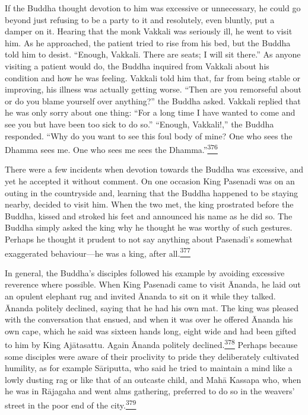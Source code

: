 If the Buddha thought devotion to him was excessive or unnecessary, he
could go beyond just refusing to be a party to it and resolutely, even
bluntly, put a damper on it. Hearing that the monk Vakkali was seriously
ill, he went to visit him. As he approached, the patient tried to rise
from his bed, but the Buddha told him to desist. ``Enough, Vakkali.
There are seats; I will sit there.'' As anyone visiting a patient would
do, the Buddha inquired from Vakkali about his condition and how he was
feeling. Vakkali told him that, far from being stable or improving, his
illness was actually getting worse. ``Then are you remorseful about or
do you blame yourself over anything?'' the Buddha asked. Vakkali replied
that he was only sorry about one thing: ``For a long time I have wanted
to come and see you but have been too sick to do so.'' ``Enough,
Vakkali!,'' the Buddha responded. ``Why do you want to see this foul
body of mine? One who sees the Dhamma sees me. One who sees me sees the
Dhamma.''\label{footprints_split_011.html_fnref376}\hyperref[footprints_split_024.htmlux5cux23fn376]{\textsuperscript{376}}

There were a few incidents when devotion towards the Buddha was
excessive, and yet he accepted it without comment. On one occasion King
Pasenadi was on an outing in the countryside and, learning that the
Buddha happened to be staying nearby, decided to visit him. When the two
met, the king prostrated before the Buddha, kissed and stroked his feet
and announced his name as he did so. The Buddha simply asked the king
why he thought he was worthy of such gestures. Perhaps he thought it
prudent to not say anything about Pasenadi's somewhat exaggerated
behaviour---he was a king, after
all.\label{footprints_split_011.html_fnref377}\hyperref[footprints_split_024.htmlux5cux23fn377]{\textsuperscript{377}}

In general, the Buddha's disciples followed his example by avoiding
excessive reverence where possible. When King Pasenadi came to visit
Ānanda, he laid out an opulent elephant rug and invited Ānanda to sit on
it while they talked. Ānanda politely declined, saying that he had his
own mat. The king was pleased with the conversation that ensued, and
when it was over he offered Ānanda his own cape, which he said was
sixteen hands long, eight wide and had been gifted to him by King
Ajātasattu. Again Ānanda politely
declined.\label{footprints_split_011.html_fnref378}\hyperref[footprints_split_024.htmlux5cux23fn378]{\textsuperscript{378}}
Perhaps because some disciples were aware of their proclivity to pride
they deliberately cultivated humility, as for example Sāriputta, who
said he tried to maintain a mind like a lowly dusting rag or like that
of an outcaste child, and Mahā Kassapa who, when he was in Rājagaha and
went alms gathering, preferred to do so in the weavers' street in the
poor end of the
city.\label{footprints_split_011.html_fnref379}\hyperref[footprints_split_024.htmlux5cux23fn379]{\textsuperscript{379}}

